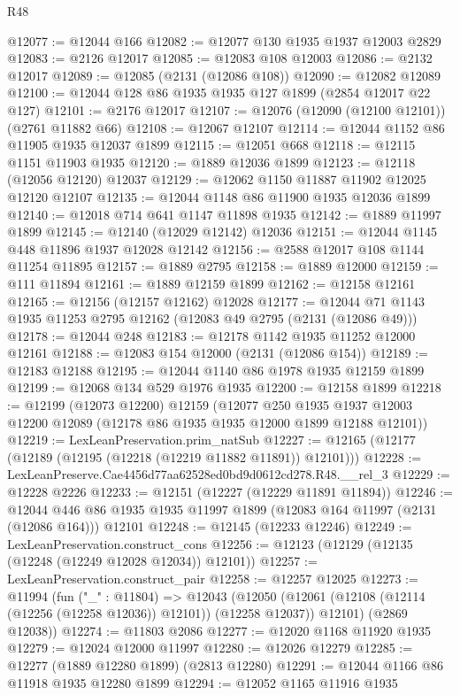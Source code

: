 \begin{lexlean}{R48}
\begin{coremodule}
@12077 := @12044 @166
@12082 := @12077 @130 @1935 @1937 @12003 @2829
@12083 := @2126 @12017
@12085 := @12083 @108 @12003
@12086 := @2132 @12017
@12089 := @12085 (@2131 (@12086 @108))
@12090 := @12082 @12089
@12100 := @12044 @128 @86 @1935 @1935 @127 @1899 (@2854 @12017 @22 @127)
@12101 := @2176 @12017
@12107 := @12076 (@12090 (@12100 @12101)) (@2761 @11882 @66)
@12108 := @12067 @12107
@12114 := @12044 @1152 @86 @11905 @1935 @12037 @1899
@12115 := @12051 @668
@12118 := @12115 @1151 @11903 @1935
@12120 := @1889 @12036 @1899
@12123 := @12118 (@12056 @12120) @12037
@12129 := @12062 @1150 @11887 @11902 @12025 @12120 @12107
@12135 := @12044 @1148 @86 @11900 @1935 @12036 @1899
@12140 := @12018 @714 @641 @1147 @11898 @1935
@12142 := @1889 @11997 @1899
@12145 := @12140 (@12029 @12142) @12036
@12151 := @12044 @1145 @448 @11896 @1937 @12028 @12142
@12156 := @2588 @12017 @108 @1144 @11254 @11895
@12157 := @1889 @2795
@12158 := @1889 @12000
@12159 := @111 @11894
@12161 := @1889 @12159 @1899
@12162 := @12158 @12161
@12165 := @12156 (@12157 @12162) @12028
@12177 := @12044 @71 @1143 @1935 @11253 @2795 @12162 (@12083 @49 @2795 (@2131 (@12086 @49)))
@12178 := @12044 @248
@12183 := @12178 @1142 @1935 @11252 @12000 @12161
@12188 := @12083 @154 @12000 (@2131 (@12086 @154))
@12189 := @12183 @12188
@12195 := @12044 @1140 @86 @1978 @1935 @12159 @1899
@12199 := @12068 @134 @529 @1976 @1935
@12200 := @12158 @1899
@12218 := @12199
    (@12073 @12200)
    @12159
    (@12077
      @250
      @1935
      @1937
      @12003
      @12200
      @12089
      (@12178 @86 @1935 @1935 @12000 @1899 @12188 @12101))
@12219 := LexLeanPreservation.prim_natSub
@12227 := @12165 (@12177 (@12189 (@12195 (@12218 (@12219 @11882 @11891)) @12101)))
@12228 := LexLeanPreserve.Cae4456d77aa62528ed0bd9d0612cd278.R48.__rel_3
@12229 := @12228 @2226
@12233 := @12151 (@12227 (@12229 @11891 @11894))
@12246 := @12044 @446 @86 @1935 @1935 @11997 @1899 (@12083 @164 @11997 (@2131 (@12086 @164))) @12101
@12248 := @12145 (@12233 @12246)
@12249 := LexLeanPreservation.construct_cons
@12256 := @12123 (@12129 (@12135 (@12248 (@12249 @12028 @12034)) @12101))
@12257 := LexLeanPreservation.construct_pair
@12258 := @12257 @12025
@12273 := @11994
    (fun ("_" : @11804) =>
    @12043
      (@12050 (@12061 (@12108 (@12114 (@12256 (@12258 @12036)) @12101)) (@12258 @12037)) @12101)
      (@2869 @12038))
@12274 := @11803 @2086
@12277 := @12020 @1168 @11920 @1935
@12279 := @12024 @12000 @11997
@12280 := @12026 @12279
@12285 := @12277 (@1889 @12280 @1899) (@2813 @12280)
@12291 := @12044 @1166 @86 @11918 @1935 @12280 @1899
@12294 := @12052 @1165 @11916 @1935

\end{coremodule}
\end{lexlean}
